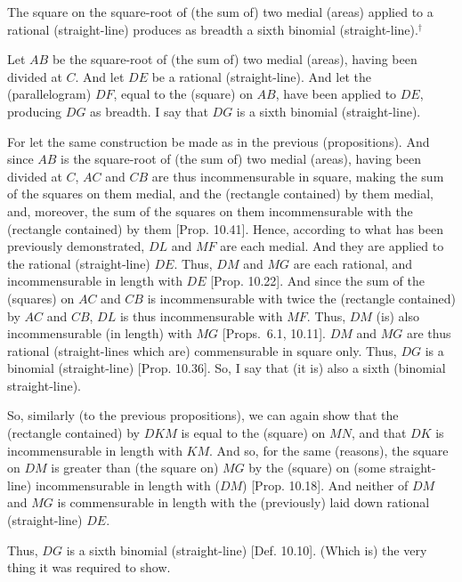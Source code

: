 \begin{Parallel}{}{}
{The square on the square-root of (the sum of) two medial
(areas) applied to a rational (straight-line) produces as breadth  a sixth binomial (straight-line).$^\dag$

Let $AB$ be the square-root of (the sum of) two medial (areas), having been divided
at $C$. And let $DE$ be a  rational (straight-line). And let the (parallelogram) $DF$, equal to the (square) on $AB$, have been applied to $DE$, producing $DG$
as breadth. I say that $DG$ is a sixth binomial (straight-line).

\epsfysize=1.6in 
\centerline{}

For  let the same construction  be made  as in the previous (propositions). And since $AB$ is the square-root of (the sum of) two medial
(areas), having been divided at $C$, $AC$ and $CB$ are thus incommensurable
in square, making the sum of the squares on them medial, and the (rectangle
contained) by them medial, and, moreover, the sum of the squares on them
incommensurable with the (rectangle contained) by them [Prop. 10.41]. Hence, according to
what has been previously  demonstrated, $DL$ and $MF$ are each medial.
And they are applied to the rational (straight-line) $DE$. Thus, $DM$ and
$MG$ are each rational, and incommensurable in length with $DE$ [Prop. 10.22]. And since the sum of the (squares)
on $AC$ and $CB$ is incommensurable with twice the (rectangle contained)
by $AC$ and $CB$, $DL$ is thus incommensurable with $MF$. Thus,
$DM$ (is) also incommensurable (in length) with $MG$
[Props.~6.1, 10.11]. 
$DM$ and $MG$ are thus rational (straight-lines which are) commensurable
in square only. Thus, $DG$ is a binomial (straight-line) [Prop. 10.36]. So, I say that (it is) also a sixth
(binomial straight-line).

So, similarly (to the previous propositions), we can again show that the (rectangle contained) by $DKM$ is equal to the (square) on $MN$, and that
$DK$ is incommensurable in length with $KM$. And so, for the same (reasons), the square on $DM$ is greater than (the square on) $MG$ by the
(square) on (some straight-line) incommensurable in length with ($DM$) [Prop. 10.18]. And neither of $DM$ and $MG$
is commensurable in length with the (previously) laid down rational (straight-line) $DE$.

Thus, $DG$ is a sixth binomial (straight-line) [Def. 10.10]. (Which is) the very thing it
was required to show.}
\end{Parallel}


\vspace{7pt}{\footnotesize\noindent $^\dag$ In other words, the square of the square-root of  two  medials  is a
sixth binomial. See Prop.~10.59.}

